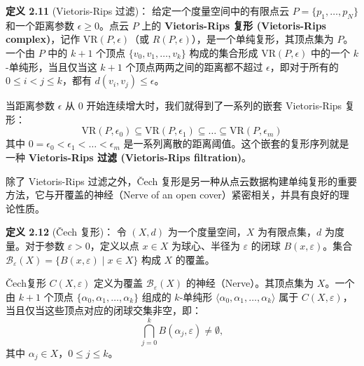 \textbf{定义 2.11} (Vietoris-Rips 过滤)\cite{zomorodian2004computing}：
给定一个度量空间中的有限点云 $P = \{p_1, \ldots, p_N\}$ 和一个距离参数 $\epsilon \ge 0$。点云 $P$ 上的 \textbf{Vietoris-Rips 复形 (Vietoris-Rips complex)}，记作 $\text{VR}(P, \epsilon)$（或 $R(P, \epsilon)$），是一个单纯复形，其顶点集为 $P$。一个由 $P$ 中的 $k+1$ 个顶点 $\{v_0, v_1, \ldots, v_k\}$ 构成的集合形成 $\text{VR}(P, \epsilon)$ 中的一个 $k$-单纯形，当且仅当这 $k+1$ 个顶点两两之间的距离都不超过 $\epsilon$，即对于所有的 $0 \le i < j \le k$，都有 $d(v_i, v_j) \le \epsilon$。

当距离参数 $\epsilon$ 从 $0$ 开始连续增大时，我们就得到了一系列的嵌套 Vietoris-Rips 复形：
$$ \text{VR}(P, \epsilon_0) \subseteq \text{VR}(P, \epsilon_1) \subseteq \dots \subseteq \text{VR}(P, \epsilon_m) $$
其中 $0 = \epsilon_0 < \epsilon_1 < \dots < \epsilon_m$ 是一系列离散的距离阈值。这个嵌套的复形序列就是一种 \textbf{Vietoris-Rips 过滤 (Vietoris-Rips filtration)}。

除了 Vietoris-Rips 过滤之外，Čech 复形是另一种从点云数据构建单纯复形的重要方法，它与开覆盖的神经（Nerve of an open cover）紧密相关，并具有良好的理论性质。

\textbf{定义 2.12} (Čech 复形)\cite{zomorodian2004computing}：
令 $(X, d)$ 为一个度量空间，$X$ 为有限点集，$d$ 为度量。对于参数 $\varepsilon > 0$，定义以点 $x \in X$ 为球心、半径为 $\varepsilon$ 的闭球 $B(x, \varepsilon)$。集合 $\mathcal{B}_{\varepsilon}(X) = \{B(x, \varepsilon) \mid x \in X\}$ 构成 $X$ 的覆盖。

Čech复形 $C(X, \varepsilon)$ 定义为覆盖 $\mathcal{B}_{\varepsilon}(X)$ 的神经（Nerve）。其顶点集为 $X$。一个由 $k+1$ 个顶点 $\{\alpha_0, \alpha_1, \ldots, \alpha_k\}$ 组成的 $k$-单纯形 $\langle \alpha_0, \alpha_1, \ldots, \alpha_k \rangle$ 属于 $C(X, \varepsilon)$，当且仅当这些顶点对应的闭球交集非空，即：
\[ \bigcap_{j=0}^{k} B(\alpha_j, \varepsilon) \neq \emptyset, \]
其中 $\alpha_j \in X$，$0 \leq j \leq k$。

